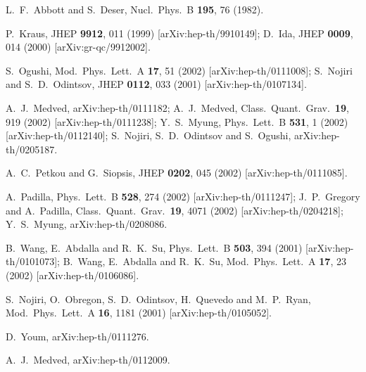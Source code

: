 \documentclass[a4paper,12pt]{article}
\begin{document}
\begin{thebibliography}{99}
L.~F.~Abbott and S.~Deser,
Nucl.\ Phys.\ B {\bf 195}, 76 (1982).

P.~Kraus,
JHEP {\bf 9912}, 011 (1999)
[arXiv:hep-th/9910149];
D.~Ida,
JHEP {\bf 0009}, 014 (2000)
[arXiv:gr-qc/9912002].


S.~Ogushi,
Mod.\ Phys.\ Lett.\ A {\bf 17}, 51 (2002) [arXiv:hep-th/0111008];
S.~Nojiri and S.~D.~Odintsov,
JHEP {\bf 0112}, 033 (2001)
[arXiv:hep-th/0107134].


A.~J.~Medved,
arXiv:hep-th/0111182;
A.~J.~Medved,
Class.\ Quant.\ Grav.\  {\bf 19}, 919 (2002)
[arXiv:hep-th/0111238];
Y.~S.~Myung,
Phys.\ Lett.\ B {\bf 531}, 1 (2002) [arXiv:hep-th/0112140];
S.~Nojiri, S.~D.~Odintsov and S.~Ogushi,
arXiv:hep-th/0205187.

A.~C.~Petkou and G.~Siopsis,
JHEP {\bf 0202}, 045 (2002) [arXiv:hep-th/0111085].

A.~Padilla,
Phys.\ Lett.\ B {\bf 528}, 274 (2002) [arXiv:hep-th/0111247];
J.~P.~Gregory and A.~Padilla,
Class.\ Quant.\ Grav.\  {\bf 19}, 4071 (2002)
[arXiv:hep-th/0204218];
Y.~S.~Myung,
arXiv:hep-th/0208086.


B.~Wang, E.~Abdalla and R.~K.~Su,
Phys.\ Lett.\ B {\bf 503}, 394 (2001)
[arXiv:hep-th/0101073];
B.~Wang, E.~Abdalla and R.~K.~Su,
Mod.\ Phys.\ Lett.\ A {\bf 17}, 23 (2002)
[arXiv:hep-th/0106086].

S.~Nojiri, O.~Obregon, S.~D.~Odintsov, H.~Quevedo and M.~P.~Ryan,
Mod.\ Phys.\ Lett.\ A {\bf 16}, 1181 (2001)
[arXiv:hep-th/0105052].

D.~Youm,
arXiv:hep-th/0111276.

A.~J.~Medved,
arXiv:hep-th/0112009.











\end{thebibliography}
\end{document}
